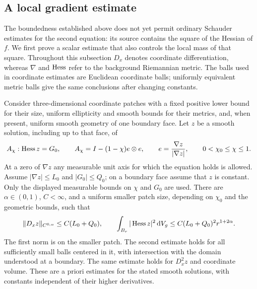 \subsection{A local gradient estimate}

The boundedness established above does not yet permit ordinary Schauder
estimates for the second equation: its source contains the square of the
Hessian of $f$.  We first prove a scalar estimate that also controls the
local mass of that square.  Throughout this subsection $D_x$ denotes
coordinate differentiation, whereas $\nabla$ and $\operatorname{Hess}$ refer to the
background Riemannian metric.  The balls used in coordinate estimates are
Euclidean coordinate balls; uniformly equivalent metric balls give the
same conclusions after changing constants.

\begin{lemma}\label{g:gradient}
Consider three-dimensional coordinate patches with a fixed positive lower
bound for their size, uniform ellipticity and smooth bounds for their
metrics, and, when present, uniform smooth geometry of one boundary face.
Let $z$ be a smooth solution, including up to that face, of
\begin{equation}\label{g:axial-equation}
 A_\chi:\operatorname{Hess} z=G_0,\qquad
 A_\chi=I-(1-\chi)e\otimes e,\qquad
 e=\frac{\nabla z}{|\nabla z|},\qquad
 0<\chi_0\leq\chi\leq1.
\end{equation}
At a zero of $\nabla z$ any measurable unit axis for which the equation
holds is allowed.  Assume
$|\nabla z|\leq L_0$ and $|G_0|\leq Q_0$; on a boundary face assume that
$z$ is constant.  Only the displayed measurable bounds on $\chi$ and
$G_0$ are used.  There are $\alpha\in(0,1)$, $C<\infty$, and a uniform
smaller patch size, depending on $\chi_0$ and the geometric bounds, such
that
\begin{equation}\label{g:gradient-estimates}
 \|D_xz\|_{C^{0,\alpha}}\leq C(L_0+Q_0),\qquad
 \int_{B_r}|\operatorname{Hess} z|^2\,\mathrm d V_g
       \leq C(L_0+Q_0)^2r^{1+2\alpha}.
\end{equation}
The first norm is on the smaller patch.  The second estimate holds for
all sufficiently small balls centered in it, with intersection with the
domain understood at a boundary.  The same estimate holds for $D_x^2z$
and coordinate volume.  These are a priori estimates for the stated
smooth solutions, with constants independent of their higher derivatives.
\end{lemma}

